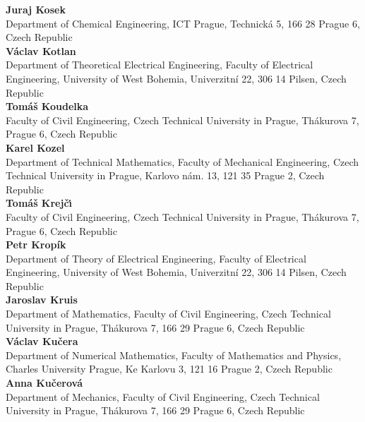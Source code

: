 \noindent
{\bf Juraj Kosek}\\
Department of Chemical Engineering,
ICT Prague,
Technick\'a 5,
166 28 Prague 6,
Czech Republic\\

\noindent
{\bf V\'aclav Kotlan}\\
Department of Theoretical Electrical Engineering,
Faculty of Electrical Engineering,
University of West Bohemia,
Univerzitn\'i 22,
306 14 Pilsen,
Czech Republic\\

\noindent
{\bf Tom\'a\v s Koudelka}\\
Faculty of Civil Engineering,
Czech Technical University in Prague,
Th\'akurova 7,
Prague 6,
Czech Republic\\

\noindent
{\bf Karel Kozel}\\
Department of Technical Mathematics,
Faculty of Mechanical Engineering,
Czech Technical University in Prague,
Karlovo n\'am. 13,
121 35 Prague 2,
Czech Republic\\

\noindent
{\bf Tom\'a\v s Krej\v c\'{\i}}\\
Faculty of Civil Engineering,
Czech Technical University in Prague,
Th\'akurova 7,
Prague 6,
Czech Republic\\

\noindent
{\bf Petr Krop\'ik}\\
Department of Theory of Electrical Engineering,
Faculty of Electrical Engineering,
University of West Bohemia,
Univerzitn\'i 22,
306 14 Pilsen,
Czech Republic\\

\noindent
{\bf Jaroslav Kruis}\\
Department of Mathematics,
Faculty of Civil Engineering,
Czech Technical University in Prague,
Th\'akurova 7,
166 29 Prague 6,
Czech Republic\\

\noindent
{\bf V\'aclav Ku\v cera}\\
Department of Numerical Mathematics,
Faculty of Mathematics and Physics,
Charles University Prague,
Ke Karlovu 3,
121 16 Prague 2,
Czech Republic\\

\noindent
{\bf Anna Ku\v cerov\'a}\\
Department of Mechanics,
Faculty of Civil Engineering,
Czech Technical University in Prague,
Th\'aku\-rova 7,
166 29 Prague 6,
Czech Republic\\

